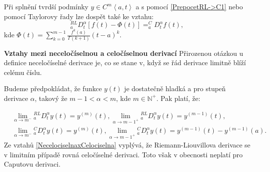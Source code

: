 \documentclass[a4paper,12pt,twoside]{article}
\theoremstyle{definition}
\theoremstyle{remark}
\numberwithin{equation}{section}
\numberwithin{table}{section}
\numberwithin{figure}{section}
\newcommand{\N}{\mathbb{N}}
\begin{document}
Při splnění tvrdší podmínky $y \in C^{m} \left\langle a, t\right\rangle $ a s pomocí \eqref{PrepocetRL->C1} nebo pomocí Taylorovy řady lze dospět také ke vztahu:
\begin{equation}
	_{a}^{RL}D^{\alpha}_{t} \left[f\left(t\right) - \Phi \left(t\right) \right] = _{a}^{C}D^{\alpha}_{t} f\left(t\right),
\end{equation} 
kde $\Phi \left(t\right) = \sum_{k=0}^{m-1} \frac{f^{k}\left(a\right)}{\Gamma \left(k+1\right)} \left(t-a\right)^{k}$.


\textbf{Vztahy mezi neceločíselnou a celočíselnou derivací}
Přirozenou otázkou u definice neceločíselné derivace je, co se stane v, když se řád derivace limitně blíží celému číslu.

Budeme předpokládat, že funkce $y\left(t\right)$ je dostatečně hladká a pro stupeň derivace $\alpha$, takový že $m-1<\alpha<m$, kde $m \in \N^{+}$. Pak platí, že:

\begin{equation} \label{NecelociselnaxCelociselna}
	\begin{aligned}
		&\lim\limits_{\alpha \to m^{-}} {_{a}^{RL}D^{\alpha}_{t}} y\left(t\right) = y^{\left(m\right)} \left(t\right),
		\lim\limits_{\alpha \to {m-1}^{+}} {_{a}^{RL}D^{\alpha}_{t}} y\left(t\right) = y^{\left(m-1\right)} \left(t\right), \\
		&\lim\limits_{\alpha \to m^{-}} {_{a}^{C}D^{\alpha}_{t}} y\left(t\right) = y^{\left(m\right)} \left(t\right),
		\lim\limits_{\alpha \to {m-1}^{+}} {_{a}^{C}D^{\alpha}_{t}} y\left(t\right) = y^{\left(m-1\right)} \left(t\right)- y^{\left(m-1\right)} \left(a\right).
	\end{aligned}
\end{equation} 
\cite{Cangpin}
Ze vztahů \ref{NecelociselnaxCelociselna} vyplývá, že Riemann-Liouvillova derivace se v limitním případě rovná celočíselné derivaci. Toto však v obecnosti neplatí pro Caputovu derivaci.
\end{document}
